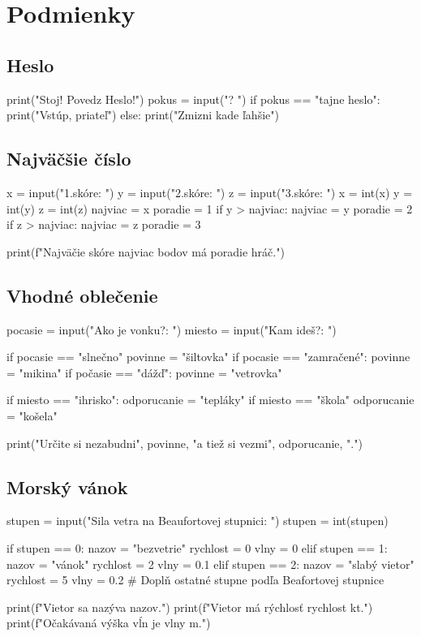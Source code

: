 \section{Podmienky}

\subsection{Heslo}
\begin{solution}
print("Stoj! Povedz Heslo!")
pokus = input("? ")
if pokus == "tajne heslo":
    print("Vstúp, priateľ")
else:
    print("Zmizni kade ľahšie")
\end{solution}

\subsection{Najväčšie číslo}
\begin{solution}
x = input("1.skóre: ")
y = input("2.skóre: ")
z = input("3.skóre: ")
x = int(x)
y = int(y)
z = int(z)
najviac = x
poradie = 1
if y > najviac:
    najviac = y
    poradie = 2
if z > najviac:
    najviac = z
    poradie = 3

print(f"Najväčie skóre {najviac} bodov má {poradie} hráč.")
\end{solution}

\subsection{Vhodné oblečenie}

\begin{solution}
pocasie = input("Ako je vonku?: ")
miesto = input("Kam ideš?: ")

if pocasie == "slnečno"
	povinne = "šiltovka"
if pocasie == "zamračené":
	povinne = "mikina"
if počasie == "dážď":
	povinne = "vetrovka"
	
if miesto == "ihrisko":
	odporucanie = "tepláky"
if miesto == "škola"
	odporucanie = "košela"

print("Určite si nezabudni", povinne, "a tiež si vezmi", odporucanie, ".")
\end{solution}

\subsection{Morský vánok}
\begin{solution}
stupen = input("Sila vetra na Beaufortovej stupnici: ")
stupen = int(stupen)

if stupen == 0:
	nazov = "bezvetrie"
	rychlost = 0
	vlny = 0
elif stupen == 1:
	nazov = "vánok"
	rychlost = 2
	vlny = 0.1
elif stupen == 2:
	nazov = "slabý vietor"
	rychlost = 5
	vlny = 0.2
# Doplň ostatné stupne podľa Beafortovej stupnice

print(f"Vietor sa nazýva {nazov}.")
print(f"Vietor má rýchlosť {rychlost} kt.")
print(f"Očakávaná výška vĺn je {vlny} m.")
\end{solution}

